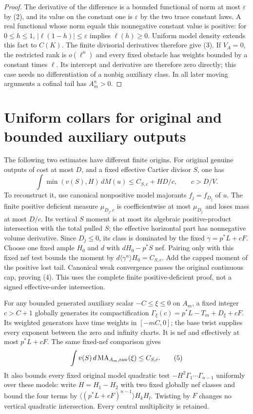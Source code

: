 \documentclass[11pt]{article}
\newcommand{\MA}{\operatorname{MA}}
\begin{document}
\begin{proof}
The derivative of the difference is a bounded functional of norm
at most $\varepsilon$ by (2), and its value on the constant one is
$\varepsilon$ by the two trace constant laws.
A real functional whose norm equals this nonnegative constant
value is positive: for $0\leq h\leq1$,
$|\ell(1-h)|\leq\varepsilon$ implies $\ell(h)\geq0$.
Uniform model density extends this fact to $C(K)$.
The finite divisorial derivatives therefore give (3).
If $V_A=0$, the restricted rank is $o(\ell^n)$ and every fixed
obstacle has weights bounded by a constant times $\ell$.
Its intercept and derivative are therefore zero directly; this
case needs no differentiation of a nonbig auxiliary class.
In all later moving arguments a cofinal tail has $A_m^n>0$.
\end{proof}

\section{Uniform collars for original and bounded auxiliary outputs}
The following two estimates have different finite origins.
For original genuine outputs of cost at most $D$, and a fixed
effective Cartier divisor $S$, one has
\[
 \int\min(v(S),H)\,dM(u)\leq C_{S,c}+HD/c,\qquad c>D/V. \tag{4}
\]
To reconstruct it, use canonical nonpositive model majorants
$f_j=f_{D_j}$ of $u$. The finite positive deficient measure
$\mu_{D_j,c}$ is coefficientwise at most $\mu_{D_j}$ and loses
mass at most $D/c$.
Its vertical $S$ moment is at most its algebraic positive-product
intersection with the total pulled $S$; the effective horizontal
part has nonnegative volume derivative.
Since $D_j\leq0$, its class is dominated by the fixed
$\gamma=p^*L+cF$.
Choose one fixed ample $H_0$ and $d$ with $dH_0-p^*S$ nef.
Pairing only with this fixed nef test bounds the moment by
$d\langle\gamma^n\rangle H_0=C_{S,c}$.
Add the capped moment of the positive lost tail.
Canonical weak convergence passes the original continuous cap,
proving (4). This uses the complete finite positive-deficient proof,
not a signed effective-order intersection.

For any bounded generated auxiliary scalar
$-C\leq\xi\leq0$ on $A_m$, a fixed integer $c>C+1$ globally
generates its compactification
$\Gamma_\xi(c)=p^*L-T_m+D_\xi+cF$.
Its weighted generators have time weights in $[-mC,0]$;
the base twist supplies every exponent between the zero and
infinity charts. It is nef and effectively at most $p^*L+cF$.
The same fixed-nef comparison gives
\[
 \int v(S)\,d\MA_{A_m,\rm raw}(\xi)\leq C_{S,c}.        \tag{5}
\]
It also bounds every fixed original model quadratic test
$-H^2\Gamma_1\cdots\Gamma_{n-1}$ uniformly over these models:
write $H=H_1-H_2$ with two fixed globally nef classes and bound
the four terms by
$\langle(p^*L+cF)^{n-1}\rangle H_kH_l$.
Twisting by $F$ changes no vertical quadratic intersection.
Every central multiplicity is retained.
\end{document}
